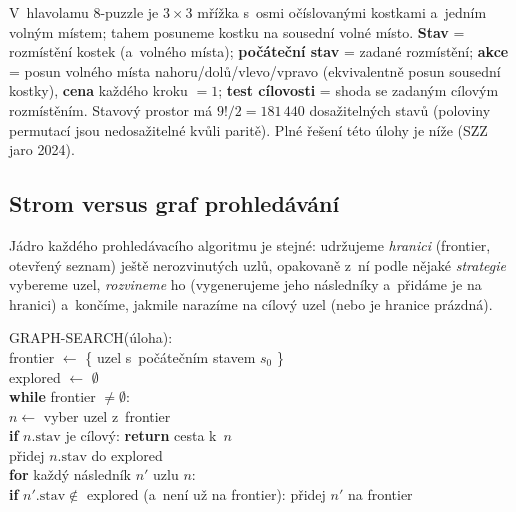 \begin{priklad}
V~hlavolamu 8-puzzle je $3\times 3$ mřížka s~osmi očíslovanými kostkami a~jedním volným místem; tahem posuneme kostku na sousední volné místo. \textbf{Stav} = rozmístění kostek (a~volného místa); \textbf{počáteční stav} = zadané rozmístění; \textbf{akce} = posun volného místa nahoru/dolů/vlevo/vpravo (ekvivalentně posun sousední kostky), \textbf{cena} každého kroku $=1$; \textbf{test cílovosti} = shoda se zadaným cílovým rozmístěním. Stavový prostor má $9!/2 = 181\,440$ dosažitelných stavů (poloviny permutací jsou nedosažitelné kvůli paritě). Plné řešení této úlohy je níže (SZZ jaro 2024).
\end{priklad}

\subsection{Strom versus graf prohledávání}

Jádro každého prohledávacího algoritmu je stejné: udržujeme \emph{hranici} (frontier, otevřený seznam) ještě nerozvinutých uzlů, opakovaně z~ní podle nějaké \emph{strategie} vybereme uzel, \emph{rozvineme} ho (vygenerujeme jeho následníky a~přidáme je na hranici) a~končíme, jakmile narazíme na cílový uzel (nebo je hranice prázdná).

\begin{algo}
\ttfamily\small
GRAPH-SEARCH(úloha):\\
\hspace*{1.5em}frontier $\leftarrow$ \{ uzel s~počátečním stavem $s_0$ \}\\
\hspace*{1.5em}explored $\leftarrow$ $\emptyset$ \\
\hspace*{1.5em}\textbf{while} frontier $\neq \emptyset$:\\
\hspace*{3em}$n \leftarrow$ vyber uzel z~frontier \\
\hspace*{3em}\textbf{if} $n.\mathrm{stav}$ je cílový: \textbf{return} cesta k~$n$\\
\hspace*{3em}přidej $n.\mathrm{stav}$ do explored\\
\hspace*{3em}\textbf{for} každý následník $n'$ uzlu $n$:\\
\hspace*{4.5em}\textbf{if} $n'.\mathrm{stav} \notin$ explored (a~není už na frontier): přidej $n'$ na frontier
\end{algo}

